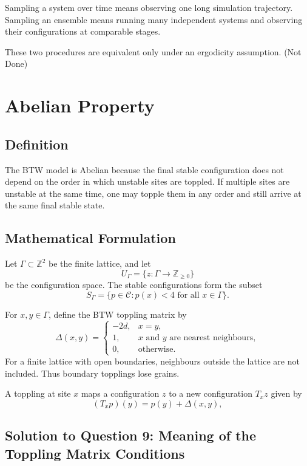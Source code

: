 \documentclass[11pt]{article}
\newcommand{\Z}{\mathbb{Z}}
\newcommand{\calC}{\mathcal{C}}
\begin{document}
Sampling a system over time means observing one long simulation trajectory.
Sampling an ensemble means running many independent systems and observing their configurations at comparable stages.

These two procedures are equivalent only under an ergodicity assumption. (Not Done)

\section{Abelian Property}

\subsection{Definition}

The BTW model is Abelian because the final stable configuration does not depend on the order in which unstable sites are toppled. 
If multiple sites are unstable at the same time, one may topple them in any order and still arrive at the same final stable state.

\subsection{Mathematical Formulation}

Let \(\Gamma\subset \Z^2\) be the finite lattice, and let
\[
    U_\Gamma = \{z:\Gamma\to \Z_{\geq 0}\}
\]
be the configuration space. 
The stable configurations form the subset
\[
    S_\Gamma =\{p\in\calC: p(x)<4 \text{ for all } x\in\Gamma\}.
\]

For \(x,y\in \Gamma\), define the BTW toppling matrix by
\[
    \Delta(x,y)
    =
    \begin{cases}
        -2d, & x=y,\\
        1, & x\text{ and }y\text{ are nearest neighbours},\\
        0, & \text{otherwise}.
    \end{cases}
\]
For a finite lattice with open boundaries, neighbours outside the lattice are not included. 
Thus boundary topplings lose grains.

A toppling at site \(x\) maps a configuration \(z\) to a new configuration \(T_x z\) given by
\[
    (T_xp)(y)=p(y)+\Delta(x,y),
\]

\subsection{Solution to Question 9: Meaning of the Toppling Matrix Conditions}
\end{document}
